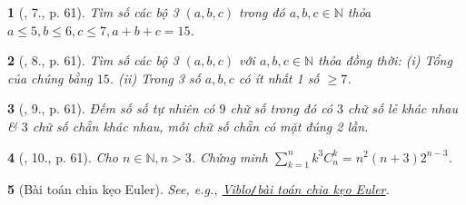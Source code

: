 \documentclass{article}
\newtheorem{baitoan}{}
\begin{document}
\begin{baitoan}[\cite{TLCT_BT_dai_so_giai_tich_11}, 7., p. 61]
	Tìm số các bộ 3 $(a,b,c)$ trong đó $a,b,c\in\mathbb{N}$ thỏa $a\le5,b\le6,c\le7,a + b + c = 15$.
\end{baitoan}

\begin{baitoan}[\cite{TLCT_BT_dai_so_giai_tich_11}, 8., p. 61]
	Tìm số các bộ 3 $(a,b,c)$ với $a,b,c\in\mathbb{N}$ thỏa đồng thời: (i) Tổng của chúng bằng $15$. (ii) Trong 3 số $a,b,c$ có ít nhất 1 số $\ge7$.
\end{baitoan}

\begin{baitoan}[\cite{TLCT_BT_dai_so_giai_tich_11}, 9., p. 61]
	Đếm số số tự nhiên có $9$ chữ số trong đó có $3$ chữ số lẻ khác nhau \& $3$ chữ số chẵn khác nhau, mỗi chữ số chẵn có mặt đúng 2 lần.
\end{baitoan}

\begin{baitoan}[\cite{TLCT_BT_dai_so_giai_tich_11}, 10., p. 61]
	Cho $n\in\mathbb{N},n > 3$. Chứng minh $\sum_{k=1}^n k^3C_n^k = n^2(n + 3)2^{n - 3}$.
\end{baitoan}

\begin{baitoan}[Bài toán chia kẹo Euler]
	See, e.g., \href{https://viblo.asia/p/bai-toan-chia-keo-euler-L4x5xqvqKBM}{Viblo{\tt/}bài toán chia kẹo Euler}.
\end{baitoan}


\printbibliography[heading=bibintoc]
	
\end{document}
